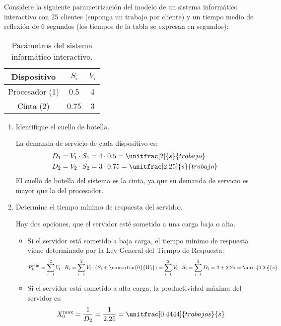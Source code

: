 \begin{ejercicio}\label{ej:5.13}
    Considere la siguiente parametrización del modelo de un sistema informático interactivo con 25 clientes (suponga un trabajo por cliente) y un tiempo medio de reflexión de 6 segundos (los tiempos de la tabla se expresan en segundos):
    \begin{table}[h]
        \centering
        \begin{tabular}{|c|c|c|}
            \hline
            Dispositivo & $S_i$ & $V_i$ \\
            \hline
            Procesador (1) & 0.5 & 4 \\
            Cinta (2) & 0.75 & 3 \\
            \hline
        \end{tabular}
        \caption{Parámetros del sistema informático interactivo.}
        \label{tab:5.13}
    \end{table}
    \begin{enumerate}
        \item Identifique el cuello de botella.
        
        La demanda de servicio de cada dispositivo es:
        \begin{align*}
            D_1 &= V_1 \cdot S_1 = 4 \cdot 0.5 = \unitfrac[2]{s}{trabajo} \\
            D_2 &= V_2 \cdot S_2 = 3 \cdot 0.75 = \unitfrac[2.25]{s}{trabajo}
        \end{align*}
        El cuello de botella del sistema es la cinta, ya que su demanda de servicio es mayor que la del procesador.
        \item Determine el tiempo mínimo de respuesta del servidor.
        
        Hay dos opciones, que el servidor esté sometido a una carga baja o alta.
        \begin{itemize}
            \item Si el servidor está sometido a baja carga, el tiempo mínimo de respuesta viene determinado por la Ley General del Tiempo de Respuesta:
            \begin{equation*}
                R_0^{\text{min}} = \sum_{i=1}^{2} V_i \cdot R_i = \sum_{i=1}^{2} V_i \cdot (S_i + \cancelto{0}{W_i}) = \sum_{i=1}^{2} V_i \cdot S_i = \sum_{i=1}^{2} D_i = 2 + 2.25 = \unit[4.25]{s}
            \end{equation*}

            \item Si el servidor está sometido a alta carga, la productividad máxima del servidor es:
            \begin{equation*}
                X_0^{\text{max}} = \dfrac{1}{D_2} = \dfrac{1}{2.25} = \unitfrac[0.4444]{trabajos}{s}
            \end{equation*}


\end{itemize}
\end{enumerate}
\end{ejercicio}
